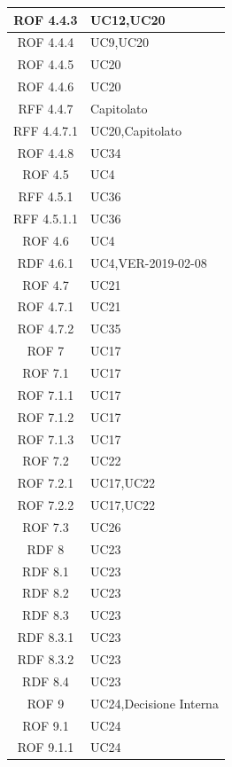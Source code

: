 \begin{center}
\begin{longtable}[c]{|c|m{}|}
\hline
ROF 4.4.3 & UC12,UC20 \\
\hline
\rowcolor{grigio}ROF 4.4.4 & UC9,UC20 \\
\hline
ROF 4.4.5 & UC20 \\
\hline
\rowcolor{grigio}ROF 4.4.6 & UC20 \\
\hline
RFF 4.4.7 & Capitolato \\
\hline
\rowcolor{grigio}RFF 4.4.7.1 & UC20,Capitolato \\
\hline
ROF 4.4.8 & UC34 \\
\hline
\rowcolor{grigio}ROF 4.5 & UC4 \\
\hline
RFF 4.5.1 & UC36 \\
\hline
\rowcolor{grigio}RFF 4.5.1.1 & UC36 \\
\hline
ROF 4.6 & UC4 \\
\hline
\rowcolor{grigio}RDF 4.6.1 & UC4,VER-2019-02-08 \\
\hline
ROF 4.7 & UC21 \\
\hline
\rowcolor{grigio}ROF 4.7.1 & UC21 \\
\hline
ROF 4.7.2 & UC35 \\
\hline
\rowcolor{grigio}ROF 7 & UC17 \\
\hline
ROF 7.1 & UC17 \\
\hline
\rowcolor{grigio}ROF 7.1.1 & UC17 \\
\hline
ROF 7.1.2 & UC17 \\
\hline
\rowcolor{grigio}ROF 7.1.3 & UC17 \\
\hline
ROF 7.2 & UC22 \\
\hline
\rowcolor{grigio}ROF 7.2.1 & UC17,UC22 \\
\hline
ROF 7.2.2 & UC17,UC22 \\
\hline
\rowcolor{grigio}ROF 7.3 & UC26 \\
\hline
RDF 8 & UC23 \\
\hline
\rowcolor{grigio}RDF 8.1 & UC23 \\
\hline
RDF 8.2 & UC23 \\
\hline
\rowcolor{grigio}RDF 8.3 & UC23 \\
\hline
RDF 8.3.1 & UC23 \\
\hline
\rowcolor{grigio}RDF 8.3.2 & UC23 \\
\hline
RDF 8.4 & UC23 \\
\hline
\rowcolor{grigio}ROF 9 & UC24,Decisione Interna \\
\hline
ROF 9.1 & UC24 \\
\hline
\rowcolor{grigio}ROF 9.1.1 & UC24 \\

\end{longtable}
\end{center}
